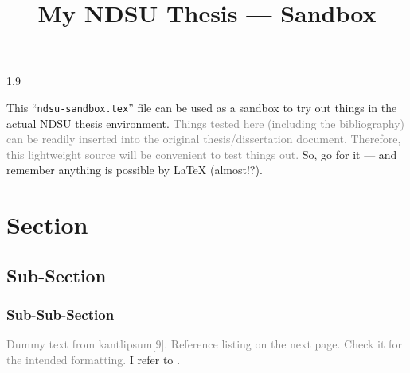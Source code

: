 \documentclass[12pt,mathdesign]{ndsu-thesis-2022}
\title{My NDSU Thesis --- Sandbox}
\newcommand{\makebib}{\biblio{myASABE}{mybib}} %
\newcommand\myspacing{1.9} %
\begin{document}
\begin{spacing}{\myspacing}      %


This ``\texttt{ndsu-sandbox.tex}'' file can be used as a sandbox to try out things in the actual NDSU thesis environment. \textcolor{gray}{Things tested here (including the bibliography) can be readily inserted into the original thesis/dissertation document. Therefore, this lightweight source will be convenient to test things out.} So, go for it --- and remember anything is possible by \LaTeX{} (almost!?). 

\section{Section}
\subsection{Sub-Section}
\subsubsection{Sub-Sub-Section}

\textcolor{gray}{Dummy text from kantlipsum[9]. Reference listing on the next page. Check it for the intended formatting.} I refer to \citep{lamport94,kopka2004guide,baczkowski1990ndsu,cassuto2010advising,pires2021teens}. \kant[9]

\makebib

\end{spacing}
\end{document}

